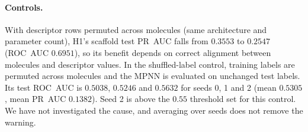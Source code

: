 \paragraph{Controls.}
With descriptor rows permuted across molecules (same architecture and parameter count), H1's scaffold test PR~AUC falls from $0.3553$ to $0.2547$ (ROC~AUC $0.6951$), so its benefit depends on correct alignment between molecules and descriptor values. In the shuffled-label control, training labels are permuted across molecules and the MPNN is evaluated on unchanged test labels. Its test ROC~AUC is $0.5038$, $0.5246$ and $0.5632$ for seeds 0, 1 and 2 (mean $0.5305$, mean PR~AUC $0.1382$). Seed 2 is above the $0.55$ threshold set for this control. We have not investigated the cause, and averaging over seeds does not remove the warning.
